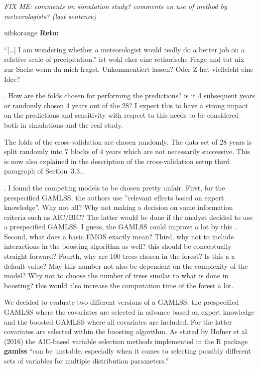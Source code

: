 \documentclass[american,foldmarks=false,noconfig]{uibklttr}
\newenvironment{review}{\fontshape{\itdefault}\fontseries{\bfdefault} \selectfont \smallskip}{\par}
\newenvironment{reto}{
    \begin{color}{uibkorange}
    \textbf{Reto:~}
        \itshape
}{
    \end{color}
}
\begin{document}
\textit{FIX ME: comments on simulation study? comments on use of
method by meteorologists? (last sentence)}

\begin{reto}
``[\dots] I am wondering whether a meteorologist would really do a
better job on a relative scale of precipitation.'' ist wohl eher eine
rethorische Frage und tut nix zur Sache wenn du mich fragst.
Unkommentiert lassen? Oder Z hat vielleicht eine Idee?
\end{reto}

\begin{review}
7. How are the folds chosen for performing the predictions? 
is it 4 subsequent years or randomly chosen 4 years out of 
the 28? I expect this to have a strong impact on the predictions 
and sensitivity with respect to this needs to be considered both 
in simulations and the real study.
\end{review}

The folds of the cross-validation are chosen randomly. The data 
set of 28 years is split randomly into 7 blocks of 4 years which 
are not necessarily successive. This is now also explained in the 
description of the cross-validation setup third paragraph of 
Section~3.3..

\begin{review}
8. I found the competing models to be chosen pretty unfair. 
First, for the prespecified GAMLSS, the authors use 
”relevant effects based on expert knowledge”. Why not all? 
Why not making a decision on some information criteria such as AIC/BIC? 
The latter would be done if the analyst decided to use a prespecified 
GAMLSS. I guess, the GAMLSS could improve a lot by this . 
Second, what does a basic EMOS exactly mean? Third, why not to include 
interactions in the boosting algorithm as well? this should be 
conceptually straight forward? Fourth, why are 100 trees chosen 
in the forest? Is this a a default value? May this number not also 
be dependent on the complexity of the model? Why not to choose 
the number of trees similar to what is done in boosting? this 
would also increase the computation time of the forest a lot.
\end{review}

We decided to evaluate two different versions of a GAMLSS: 
the prespecified GAMLSS where the covariates are selected 
in advance based on expert knowledge and the boosted GAMLSS
where all covariates are included. For the latter covariates 
are selected within the boosting algorithm. As stated by 
Hofner et al. (2016) the AIC-based variable selection 
methods implemented in the \textsf{R} package \textbf{gamlss} 
``can be unstable, especially when it comes to selecting 
possibly different sets of variables for multiple 
distribution parameters.''
\end{document}
